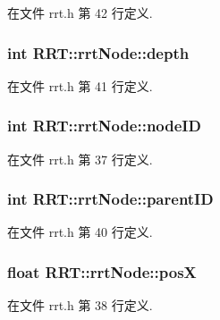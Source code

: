 在文件 rrt.\-h 第 42 行定义.

\hypertarget{structRRT_1_1rrtNode_ab20e6f5be075c8feed605c935924df30}{
\subsubsection[{depth}]{\setlength{\rightskip}{0pt plus 5cm}int R\-R\-T\-::rrt\-Node\-::depth}}\label{structRRT_1_1rrtNode_ab20e6f5be075c8feed605c935924df30}


在文件 rrt.\-h 第 41 行定义.

\hypertarget{structRRT_1_1rrtNode_aa8adf5b50e1a2a466771ae3af56b1658}{
\subsubsection[{node\-I\-D}]{\setlength{\rightskip}{0pt plus 5cm}int R\-R\-T\-::rrt\-Node\-::node\-I\-D}}\label{structRRT_1_1rrtNode_aa8adf5b50e1a2a466771ae3af56b1658}


在文件 rrt.\-h 第 37 行定义.

\hypertarget{structRRT_1_1rrtNode_a9f5b9bfca61e25fe7f80d361ed7996ff}{
\subsubsection[{parent\-I\-D}]{\setlength{\rightskip}{0pt plus 5cm}int R\-R\-T\-::rrt\-Node\-::parent\-I\-D}}\label{structRRT_1_1rrtNode_a9f5b9bfca61e25fe7f80d361ed7996ff}


在文件 rrt.\-h 第 40 行定义.

\hypertarget{structRRT_1_1rrtNode_a4c2096fa1d719cf2aa49cf21916a5a4b}{
\subsubsection[{pos\-X}]{\setlength{\rightskip}{0pt plus 5cm}float R\-R\-T\-::rrt\-Node\-::pos\-X}}\label{structRRT_1_1rrtNode_a4c2096fa1d719cf2aa49cf21916a5a4b}


在文件 rrt.\-h 第 38 行定义.

